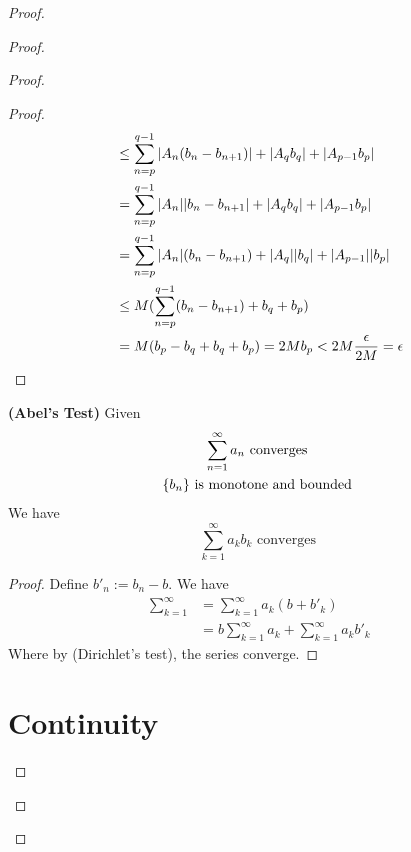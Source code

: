 \documentclass{report}
\begin{document}
\begin{proof}
\begin{proof}
\begin{proof}
\begin{proof}
\begin{align}
&\leq \sum_{n=p}^{q-1}|A_n(b_n-b_{n+1})|+|A_qb_q|+|A_{p-1}b_p|\\
&=\sum_{n=p}^{q-1} |A_n||b_n-b_{n+1}|+|A_qb_q|+|A_{p-1}b_p|\\
&=\sum_{n=p}^{q-1}|A_n|(b_n-b_{n+1})+|A_q||b_q|+|A_{p-1}||b_p|\\
&\leq M(\sum_{n=p}^{q-1}(b_n-b_{n+1})+b_q+b_p)\\
&=M(b_p-b_q+b_q+b_p)=2Mb_p<2M \frac{\epsilon }{2M}=\epsilon 
\end{align}
\end{proof}
\begin{theorem}
\label{4.5.6}
\textbf{(Abel's Test)}
Given 
\begin{gather}
\sum_{n=1}^\infty a_n\text{ converges }\\
\{ b_n \}\text{ is monotone and bounded }
\end{gather}
We have
\begin{equation}
\sum_{k=1}^\infty a_kb_k\text{ converges }
\end{equation}
\end{theorem}
\begin{proof}
Define $b'_n:=b_n-b$. We have
 \begin{align}
\sum_{k=1}^\infty &=\sum_{k=1}^\infty a_k(b+b'_k)\\
&=b\sum_{k=1}^\infty a_k+\sum_{k=1}^\infty a_kb'_k
\end{align}
Where by   (Dirichlet's test), the series converge.
\end{proof}
\chapter{Continuity}

\end{proof}
\end{proof}
\end{proof}
\end{document}
